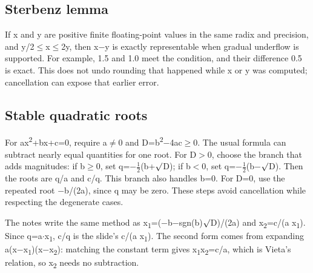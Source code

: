 \documentclass[11pt]{article}
\begin{document}
\begin{keepsection}
\begin{keepsection}
\subsection{Sterbenz lemma}

If x and y are positive finite floating-point values in the same radix and precision, and y/2\ensuremath{\leq}x\ensuremath{\leq}2y, then x\ensuremath{-}y is exactly representable when gradual underflow is supported. For example, 1.5 and 1.0 meet the condition, and their difference 0.5 is exact. This does not undo rounding that happened while x or y was computed; cancellation can expose that earlier error.
\end{keepsection}

\begin{keepsection}
\subsection{Stable quadratic roots}

For ax\textsuperscript{2}+bx+c=0, require a\ensuremath{\neq}0 and D=b\textsuperscript{2}\ensuremath{-}4ac\ensuremath{\geq}0. The usual formula can subtract nearly equal quantities for one root. For D\ensuremath{>}0, choose the branch that adds magnitudes: if b\ensuremath{\geq}0, set q=\ensuremath{-}\ensuremath{\tfrac12}(b+\ensuremath{\surd}D); if b\ensuremath{<}0, set q=\ensuremath{-}\ensuremath{\tfrac12}(b\ensuremath{-}\ensuremath{\surd}D). Then the roots are q/a and c/q. This branch also handles b=0. For D=0, use the repeated root \ensuremath{-}b/(2a), since q may be zero. These steps avoid cancellation while respecting the degenerate cases.

The notes write the same method as x\textsubscript{1}=(\ensuremath{-}b\ensuremath{-}sgn(b)\ensuremath{\surd}D)/(2a) and x\textsubscript{2}=c/(a x\textsubscript{1}). Since q=a\ensuremath{\cdot}x\textsubscript{1}, c/q is the slide’s c/(a x\textsubscript{1}). The second form comes from expanding a(x\ensuremath{-}x\textsubscript{1})(x\ensuremath{-}x\textsubscript{2}): matching the constant term gives x\textsubscript{1}x\textsubscript{2}=c/a, which is Vieta’s relation, so x\textsubscript{2} needs no subtraction.


\end{keepsection}
\end{keepsection}
\end{document}
